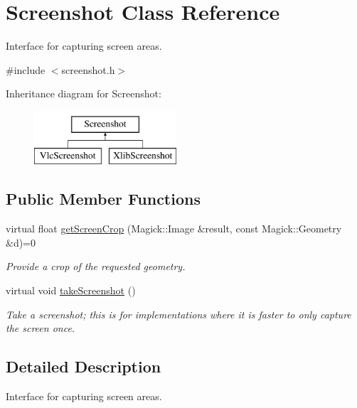 \hypertarget{classScreenshot}{}\section{Screenshot Class Reference}
\label{classScreenshot}


Interface for capturing screen areas.  




{\ttfamily \#include $<$screenshot.\+h$>$}

Inheritance diagram for Screenshot\+:\begin{figure}[H]
\begin{center}
\leavevmode
\includegraphics[height=2.000000cm]{classScreenshot}
\end{center}
\end{figure}
\subsection*{Public Member Functions}
\begin{DoxyCompactItemize}
\item 
virtual float \hyperlink{classScreenshot_a6f32c6952513af976d97f11871e679d3}{get\+Screen\+Crop} (Magick\+::\+Image \&result, const Magick\+::\+Geometry \&d)=0
\begin{DoxyCompactList}\small\item\em Provide a crop of the requested geometry. \end{DoxyCompactList}\item 
virtual void \hyperlink{classScreenshot_a2af036d2e54e9e96ac22a50d90ec17ec}{take\+Screenshot} ()\hypertarget{classScreenshot_a2af036d2e54e9e96ac22a50d90ec17ec}{}\label{classScreenshot_a2af036d2e54e9e96ac22a50d90ec17ec}

\begin{DoxyCompactList}\small\item\em Take a screenshot; this is for implementations where it is faster to only capture the screen once. \end{DoxyCompactList}\end{DoxyCompactItemize}


\subsection{Detailed Description}
Interface for capturing screen areas. 

